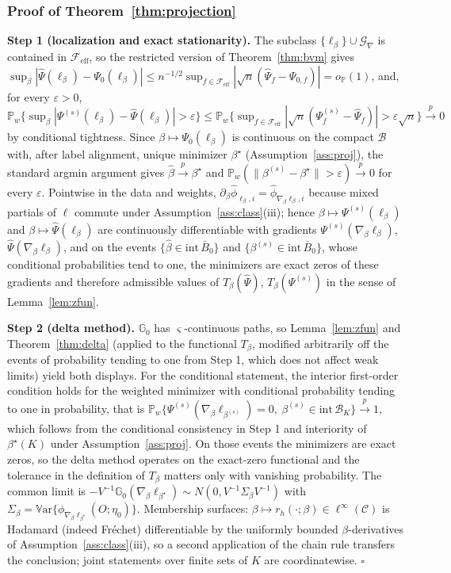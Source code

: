 \documentclass[11pt]{article}
\newcommand{\Pp}{\mathbb P}
\newcommand{\G}{\mathbb G}
\newcommand{\Var}{\mathbb V\mathrm{ar}}
\newcommand{\opro}{o_{\Pp}}
\newcommand{\pto}{\overset{p}{\to}}
\newcommand{\calB}{\mathcal B}
\newcommand{\calC}{\mathcal C}
\newcommand{\calF}{\mathcal F}
\newcommand{\calG}{\mathcal G}
\newcommand{\hPsi}{\widehat\Psi}
\newcommand{\hphi}{\widehat\phi}
\newcommand{\eps}{\varepsilon}
\newcommand{\norm}[1]{\lVert #1\rVert}
\begin{document}
\subsubsection{Proof of Theorem~\ref{thm:projection}}
\textbf{Step 1 (localization and exact stationarity).} The subclass $\{\ell_\beta\}\cup\calG_\nabla$ is contained in $\calF_{\mathrm{eff}}$, so the restricted version of Theorem~\ref{thm:bvm} gives $\sup_\beta|\hPsi(\ell_\beta)-\Psi_0(\ell_\beta)|\le n^{-1/2}\sup_{f\in\calF_{\mathrm{eff}}}|\sqrt n(\hPsi_f-\Psi_{0,f})|=\opro(1)$, and, for every $\eps>0$, $\Pp_w\{\sup_\beta|\Psi^{(s)}(\ell_\beta)-\hPsi(\ell_\beta)|>\eps\}\le\Pp_w\{\sup_{f\in\calF_{\mathrm{eff}}}|\sqrt n(\Psi^{(s)}_f-\hPsi_f)|>\eps\sqrt n\}\pto0$ by conditional tightness. Since $\beta\mapsto\Psi_0(\ell_\beta)$ is continuous on the compact $\calB$ with, after label alignment, unique minimizer $\beta^\star$ (Assumption~\ref{ass:proj}), the standard argmin argument gives $\hat\beta\pto\beta^\star$ and $\Pp_w(\norm{\beta^{(s)}-\beta^\star}>\eps)\pto0$ for every $\eps$. Pointwise in the data and weights, $\partial_\beta\hphi_{\ell_\beta,i}=\hphi_{\nabla_\beta\ell_\beta,i}$ because mixed partials of $\ell$ commute under Assumption~\ref{ass:class}(iii); hence $\beta\mapsto\Psi^{(s)}(\ell_\beta)$ and $\beta\mapsto\hPsi(\ell_\beta)$ are continuously differentiable with gradients $\Psi^{(s)}(\nabla_\beta\ell_\beta)$, $\hPsi(\nabla_\beta\ell_\beta)$, and on the events $\{\hat\beta\in\mathrm{int}\,\bar B_0\}$ and $\{\beta^{(s)}\in\mathrm{int}\,\bar B_0\}$, whose conditional probabilities tend to one, the minimizers are exact zeros of these gradients and therefore admissible values of $T_\beta(\hPsi)$, $T_\beta(\Psi^{(s)})$ in the sense of Lemma~\ref{lem:zfun}.

\textbf{Step 2 (delta method).} $\G_0$ has $\varsigma$-continuous paths, so Lemma~\ref{lem:zfun} and Theorem~\ref{thm:delta} (applied to the functional $T_\beta$, modified arbitrarily off the events of probability tending to one from Step 1, which does not affect weak limits) yield both displays. For the conditional statement, the interior first-order condition holds for the weighted minimizer with conditional probability tending to one in probability, that is $\Pp_w\{\Psi^{(s)}(\nabla_\beta\ell_{\beta^{(s)}})=0,\ \beta^{(s)}\in\mathrm{int}\,\calB_K\}\pto1$, which follows from the conditional consistency in Step 1 and interiority of $\beta^\star(K)$ under Assumption~\ref{ass:proj}. On those events the minimizers are exact zeros, so the delta method operates on the exact-zero functional and the tolerance in the definition of $T_\beta$ matters only with vanishing probability. The common limit is $-V^{-1}\G_0(\nabla_\beta\ell_{\beta^\star})\sim N(0,V^{-1}\Sigma_\beta V^{-1})$ with $\Sigma_\beta=\Var\{\phi_{\nabla_\beta\ell_{\beta^\star}}(O;\eta_0)\}$. Membership surfaces: $\beta\mapsto r_h(\cdot;\beta)\in\ell^\infty(\calC)$ is Hadamard (indeed Fr\'echet) differentiable by the uniformly bounded $\beta$-derivatives of Assumption~\ref{ass:class}(iii), so a second application of the chain rule transfers the conclusion; joint statements over finite sets of $K$ are coordinatewise. \hfill$\square$
\end{document}
